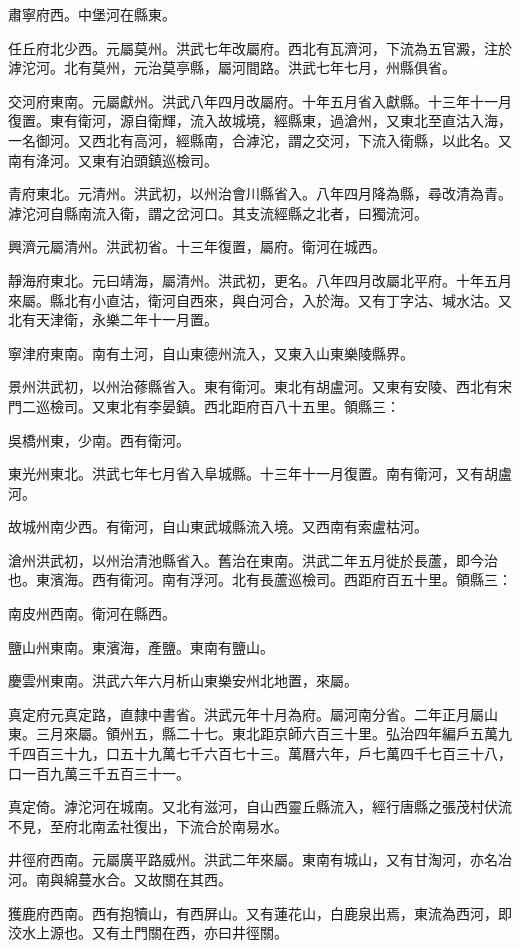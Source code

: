 肅寧府西。中堡河在縣東。

任丘府北少西。元屬莫州。洪武七年改屬府。西北有瓦濟河，下流為五官澱，注於滹沱河。北有莫州，元治莫亭縣，屬河間路。洪武七年七月，州縣俱省。

交河府東南。元屬獻州。洪武八年四月改屬府。十年五月省入獻縣。十三年十一月復置。東有衛河，源自衛輝，流入故城境，經縣東，過滄州，又東北至直沽入海，一名御河。又西北有高河，經縣南，合滹沱，謂之交河，下流入衛縣，以此名。又南有洚河。又東有泊頭鎮巡檢司。

青府東北。元清州。洪武初，以州治會川縣省入。八年四月降為縣，尋改清為青。滹沱河自縣南流入衛，謂之岔河口。其支流經縣之北者，曰獨流河。

興濟元屬清州。洪武初省。十三年復置，屬府。衛河在城西。

靜海府東北。元曰靖海，屬清州。洪武初，更名。八年四月改屬北平府。十年五月來屬。縣北有小直沽，衛河自西來，與白河合，入於海。又有丁字沽、堿水沽。又北有天津衛，永樂二年十一月置。

寧津府東南。南有土河，自山東德州流入，又東入山東樂陵縣界。

景州洪武初，以州治蓚縣省入。東有衛河。東北有胡盧河。又東有安陵、西北有宋門二巡檢司。又東北有李晏鎮。西北距府百八十五里。領縣三：

吳橋州東，少南。西有衛河。

東光州東北。洪武七年七月省入阜城縣。十三年十一月復置。南有衛河，又有胡盧河。

故城州南少西。有衛河，自山東武城縣流入境。又西南有索盧枯河。

滄州洪武初，以州治清池縣省入。舊治在東南。洪武二年五月徙於長蘆，即今治也。東濱海。西有衛河。南有浮河。北有長蘆巡檢司。西距府百五十里。領縣三：

南皮州西南。衛河在縣西。

鹽山州東南。東濱海，產鹽。東南有鹽山。

慶雲州東南。洪武六年六月析山東樂安州北地置，來屬。

真定府元真定路，直隸中書省。洪武元年十月為府。屬河南分省。二年正月屬山東。三月來屬。領州五，縣二十七。東北距京師六百三十里。弘治四年編戶五萬九千四百三十九，口五十九萬七千六百七十三。萬曆六年，戶七萬四千七百三十八，口一百九萬三千五百三十一。

真定倚。滹沱河在城南。又北有滋河，自山西靈丘縣流入，經行唐縣之張茂村伏流不見，至府北南孟社復出，下流合於南易水。

井徑府西南。元屬廣平路威州。洪武二年來屬。東南有城山，又有甘淘河，亦名冶河。南與綿蔓水合。又故關在其西。

獲鹿府西南。西有抱犢山，有西屏山。又有蓮花山，白鹿泉出焉，東流為西河，即洨水上源也。又有土門關在西，亦曰井徑關。

